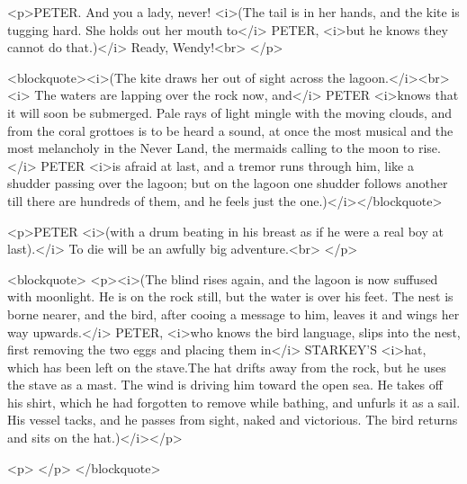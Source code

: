 <p>PETER. And you a lady, never! <i>(The tail is in her hands, and
the kite is tugging hard. She holds out her mouth to</i> PETER,
<i>but he knows they cannot do that.)</i> Ready, Wendy!<br>
</p>

<blockquote><i>(The kite draws her out of sight across the
lagoon.</i><br>
 <i>    The waters are lapping over the rock now, and</i> PETER
<i>knows that it will soon be submerged. Pale rays of light mingle
with the moving clouds, and from the coral grottoes is to be heard a
sound, at once the most musical and the most melancholy in the Never
Land, the mermaids calling to the moon to rise.</i> PETER <i>is
afraid at last, and a tremor runs through him, like a shudder passing
over the lagoon; but on the lagoon one shudder follows another till
there are hundreds of them, and he feels just the
one.)</i></blockquote>

<p>PETER <i>(with a drum beating in his breast as if he were a real
boy at last).</i> To die will be an awfully big adventure.<br>
</p>

<blockquote>
<p><i>(The blind rises again, and the lagoon is now suffused with
moonlight. He is on the rock still, but the water is over his feet.
The nest is borne nearer, and the bird, after cooing a message to
him, leaves it and wings her way upwards.</i> PETER, <i>who knows the
bird language, slips into the nest, first removing the two eggs and
placing them in</i> STARKEY'S <i>hat, which has been left on the
stave.The hat drifts away from the rock, but he uses the stave as a
mast. The wind is driving him toward the open sea. He takes off his
shirt, which he had forgotten to remove while bathing, and unfurls it
as a sail. His vessel tacks, and he passes from sight, naked and
victorious. The bird returns and sits on the hat.)</i></p>

<p> </p>
</blockquote>
